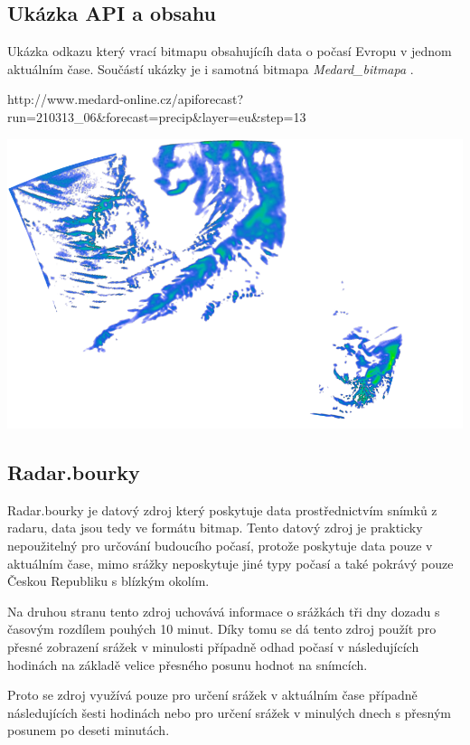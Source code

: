 \documentclass[czech,bachelor,dept460,male,csharp,cpdeclaration]{diploma}
\begin{document}
	\subsection{Ukázka API a obsahu}
	
	Ukázka odkazu který vrací bitmapu obsahujícíh data o počasí Evropu v jednom aktuálním čase. Součástí ukázky je i samotná bitmapa \emph{Medard\_bitmapa} \cite{medard}.
	
	http://www.medard-online.cz/apiforecast?run=210313\_06\&forecast=precip\&layer=eu\&step=13
	
	\begin{center}
		\includegraphics[scale=0.5]{Data/Mdrd_ukazka.png}
	\end{center}
	
	\subsection{Radar.bourky}
	
	Radar.bourky je datový zdroj který poskytuje data prostřednictvím snímků z radaru, data jsou tedy ve formátu bitmap. Tento datový zdroj je prakticky nepoužitelný pro určování budoucího počasí, protože poskytuje data pouze v aktuálním čase, mimo srážky neposkytuje jiné typy počasí a také pokrávý pouze Českou Republiku s blízkým okolím.
	
	Na druhou stranu tento zdroj uchovává informace o srážkách tři dny dozadu s časovým rozdílem pouhých 10 minut. Díky tomu se dá tento zdroj použít pro přesné zobrazení srážek v minulosti případně odhad počasí v následujících hodinách na základě velice přesného posunu hodnot na snímcích.
	
	Proto se zdroj využívá pouze pro určení srážek v aktuálním čase případně následujících šesti hodinách nebo pro určení srážek v minulých dnech s přesným posunem po deseti minutách.
	
\end{document}
